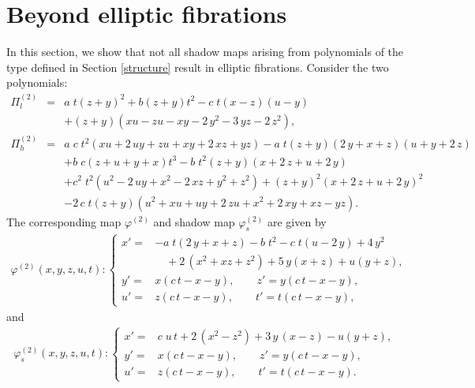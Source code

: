 \documentclass[reqno]{amsart}
\numberwithin{equation}{section}
\numberwithin{figure}{section}
\begin{document}
\section{Beyond elliptic fibrations}
\label{new_two}
In this section, we show that not all shadow maps arising from polynomials of the type defined in Section \ref{structure} result in elliptic fibrations.
Consider the two polynomials:
\begin{eqnarray*}
  \Pi_l^{(2)} &=& a\; t \left( z+y \right) ^{2}
+b \left( z+y \right) {t}^{2}
- c\;t \left(x -z \right)  \left(u -y \right) \\
&&
+ \left( z+y \right)  \left( xu-zu-xy-2\,{y}^{2}-3\,yz-2\,{z}^{2} \right),
  \\
 \Pi_h^{(2)} &=& 
a\;c\; t^2 \left( xu+2\,uy+zu+xy+2\,xz+yz \right)
-a\;t \left( z+y \right)  \left( 2\,y+x+z \right)  \left( u+y+2\,z \right) 
\\
 & &
 +b\; c   \left( z+u+y+x \right) {t}^{3}
-b\; t^2 \left( z+y \right)  \left( x+2\,z+u+2\,y \right) \\ &&
+c^2\;t^2 \left( {u}^{2}-2\,uy+{x}^{2}-2\,xz+{y}^{2}+{z}^{2} \right) 
+ \left( z+y \right) ^{2} \left( x+2\,z+u+2\,y \right) ^{2}
\\ &&
-2\,c\;t  \left( z+y \right)  \left( {u}^{2}+xu+uy+2\,zu+{x}^{2}+2\,xy+xz-yz \right) .
\end{eqnarray*}
The corresponding map $\varphi^{(2)} $ and shadow map $\varphi_s^{(2)}
$ are given by
\begin{eqnarray} \label{phi10}
\varphi^{(2)}(x, y, z, u, t):\begin{cases}
x' =& -a \;t \left( 2\,y+x+z \right) -b\;{t}^{2}- c \;t \left(u -2\,y \right) 
+4\,{y}^{2}\\
&\quad +2\,({x}^{2}+xz+z^2) +5\,y(x+z)+u( y +z),\\
y'=& x \left( c\, t-x-y \right) ,
\qquad
z' = y \left(c\, t-x-y \right) ,
\\
 u' =& z \left( c\, t-x-y \right) ,
\qquad
t' = t \left( c\, t-x-y \right) ,
\end{cases}
\end{eqnarray}
and 
\begin{eqnarray} \label{phialt10}
\varphi_s^{(2)}(x, y, z, u, t):\begin{cases}
 x' =&  c\;u\,t+2\,({x}^{2}-z^2) +3\,y\,(x-z)-u(y+z),\\
y' =& x \left(c\,  t-x-y \right) ,\qquad
z' = y \left( c\, t-x-y \right) ,\\
u' =& z \left( c\, t-x-y \right) ,\qquad
t' =  t \left( c\, t-x-y \right).
\end{cases}
\end{eqnarray}
\end{document}
